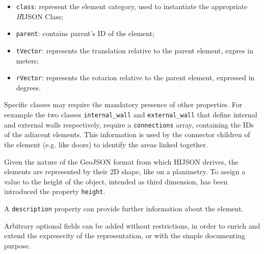 \begin{itemize}
\itemsep1pt\parskip0pt
\item
 {\tt class}: represent the element category, used to instantiate
 the appropriate {\emph HIJSON Class};
\item
 {\tt parent}: contains parent's ID of the element;
\item
 {\tt tVector}: represents the translation relative to 
 the parent element, expres in meters;
\item
 {\tt rVector}: represents the rotarion relative to 
 the parent element, expressed in  degrees.
\end{itemize}

Specific classes may require the mandatory presence of other properties. For
eexample the two classes {\tt internal\_wall} and {\tt external\_wall} that
define internal and external walls respectively, require a {\tt connections}
array, containing the IDs of the adiacent elements. This information is used
by the connector children of the element (e.g. like doors) to identify the
areas linked together.

Given the nature of the GeoJSON format from which HIJSON
derives, the elements are represented by their 2D shape, like on a
planimetry. To assign a value to the height of the object, intended as
third dimension, has been introduced the property {\tt height}.

A {\tt description} property can provide further information about
the element.

Arbitrary optional fields can be added without restrictions, in order to
enrich and extend the expressvity of the representation, or with the simple
documenting purpose.
